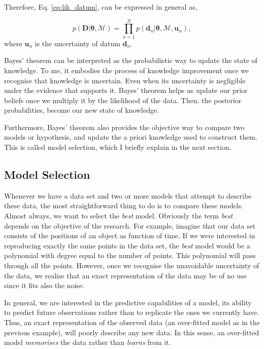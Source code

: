 Therefore, Eq. \ref{eq:lik_datum}, can be expressed in general as,

\begin{equation}
\label{eq:lik_generativemodel}
p(\mathbf{D}|\boldsymbol{\theta},\mathcal{M}) = \prod_{n=1}^N p(\mathbf{d}_n|\boldsymbol{\theta},\mathcal{M},\mathbf{u}_n),
\end{equation}
where $\mathbf{u}_n$ is the uncertainty of datum $\mathbf{d}_n$.


Bayes' theorem can be interpreted as the probabilistic way to update the state of knowledge. To me, it embodies the process of knowledge improvement once we recognise that knowledge is uncertain. Even when its uncertainty is negligible under the evidence that supports it. Bayes' theorem helps us update our prior beliefs once we multiply it by the likelihood of the data. Then, the posterior probabilities, become our new state of knowledge. 

Furthermore, Bayes' theorem also provides the objective way to compare two models or hypothesis, and update the a priori knowledge used to construct them. This is called model selection, which I  briefly explain in the next section.

\subsection{Model Selection}
\label{sect:modelselection}

Whenever we have a data set and two or more models that attempt to describe these data, the most straightforward thing to do is to compare these models. Almost always, we want to select the \emph{best} model. Obviously the term \emph{best} depends on the objective of the research. For example, imagine that our data set consists of the positions of an object as function of time. If we were interested in reproducing exactly the same points in the data set, the \emph{best} model would be a polynomial with degree equal to the number of points. This polynomial will pass through all the points. However, once we recognise the unavoidable uncertainty of the data, we realise that an exact representation of the data may be of no use since it fits also the noise. 

In general, we are interested in the predictive capabilities of a model, its ability to predict future observations rather than to replicate the ones we currently have. Thus, an exact representation of the observed data (an over-fitted model as in the previous example), will poorly describe any new data. In this sense, an over-fitted model \emph{memorises} the data rather than \emph{learns} from it.

